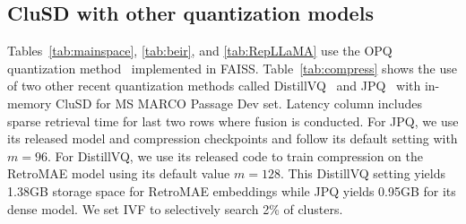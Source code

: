 \subsection{CluSD with other quantization models}
\label{sect:evalcompress}

Tables~\ref{tab:mainspace}, \ref{tab:beir},
and \ref{tab:RepLLaMA}  use the OPQ quantization method~\cite{Ge_2013_CVPR}  implemented in FAISS.
Table~\ref{tab:compress} shows the use of two other recent quantization methods 
called DistillVQ~\cite{Xiao2022Distill-VQ} and JPQ~\cite{2021CIKM-JPQ-Zhan} 
with in-memory CluSD for MS MARCO Passage Dev set. Latency column includes sparse retrieval time for last two rows where fusion is conducted. 
For JPQ, we use its released model and compression checkpoints and follow its default setting with $m=96$. 
For DistillVQ, we use its released code to train compression on the RetroMAE model using its default  value $m=128$.
This DistillVQ setting  yields 1.38GB storage space for RetroMAE embeddings while JPQ yields  0.95GB for its dense model. 
We set IVF to selectively search 2\% of clusters. 





